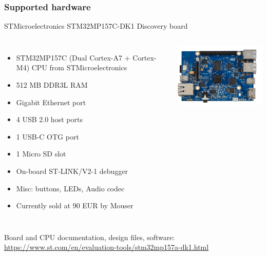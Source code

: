 \begin{frame}
\frametitle{Supported hardware}
  STMicroelectronics STM32MP157C-DK1 Discovery board
  \begin{columns}
    {\footnotesize
    \begin{itemize}
    \item STM32MP157C (Dual Cortex-A7 + Cortex-M4) CPU from STMicroelectronics
    \item 512 MB DDR3L RAM
    \item Gigabit Ethernet port
    \item 4 USB 2.0 host ports
    \item 1 USB-C OTG port
    \item 1 Micro SD slot
    \item On-board ST-LINK/V2-1 debugger
    \item Misc: buttons, LEDs, Audio codec
    \item Currently sold at 90 EUR by Mouser
    \end{itemize}
    }
    \includegraphics[width=\textwidth]{slides/discovery-board-dk1/discovery-board-dk1.png}
  \end{columns}
  \vspace{1em}
  {\small
  Board and CPU documentation, design files, software:
  \url{https://www.st.com/en/evaluation-tools/stm32mp157a-dk1.html}
  }
\end{frame}
